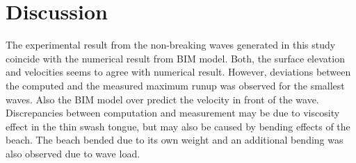 \documentclass[a4paper, 11pt, english, twoside, openright]{article}
\begin{document}
 
 
 
\section{Discussion}
\label{con_rem}



The experimental result from  the non-breaking  waves generated in this study coincide with the numerical result from BIM model. Both, the surface elevation and velocities seems to agree with numerical result. However, deviations between the computed and the measured maximum runup  was observed for the smallest waves. Also the BIM model over predict the velocity in front of the wave. Discrepancies between computation and measurement may be due to viscosity effect in the thin swash tongue, but may also be caused by bending effects of the beach. The beach bended due to its own weight and an additional bending was also observed due to wave load. 
\end{document}
